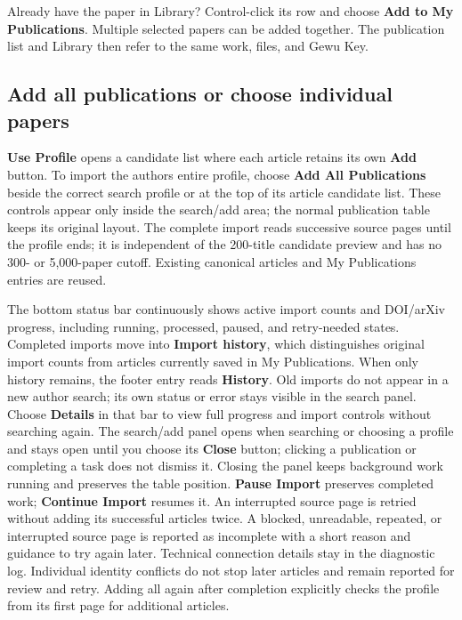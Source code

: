 \documentclass[10pt,letterpaper,oneside]{scrreprt}
\begin{document}
Already have the paper in Library? Control-click its row and choose \textbf{Add to My Publications}. Multiple selected papers can be added together. The publication list and Library then refer to the same work, files, and Gewu Key.

\subsection{Add all publications or choose individual papers}\label{add-all-publications-or-choose-individual-papers}

\textbf{Use Profile} opens a candidate list where each article retains its own \textbf{Add} button. To import the author\textquotesingle s entire profile, choose \textbf{Add All Publications} beside the correct search profile or at the top of its article candidate list. These controls appear only inside the search/add area; the normal publication table keeps its original layout. The complete import reads successive source pages until the profile ends; it is independent of the 200-title candidate preview and has no 300- or 5,000-paper cutoff. Existing canonical articles and My Publications entries are reused.

The bottom status bar continuously shows active import counts and DOI/arXiv progress, including running, processed, paused, and retry-needed states. Completed imports move into \textbf{Import history}, which distinguishes original import counts from articles currently saved in My Publications. When only history remains, the footer entry reads \textbf{History}. Old imports do not appear in a new author search; its own status or error stays visible in the search panel. Choose \textbf{Details} in that bar to view full progress and import controls without searching again. The search/add panel opens when searching or choosing a profile and stays open until you choose its \textbf{Close} button; clicking a publication or completing a task does not dismiss it. Closing the panel keeps background work running and preserves the table position. \textbf{Pause Import} preserves completed work; \textbf{Continue Import} resumes it. An interrupted source page is retried without adding its successful articles twice. A blocked, unreadable, repeated, or interrupted source page is reported as incomplete with a short reason and guidance to try again later. Technical connection details stay in the diagnostic log. Individual identity conflicts do not stop later articles and remain reported for review and retry. Adding all again after completion explicitly checks the profile from its first page for additional articles.
\end{document}
